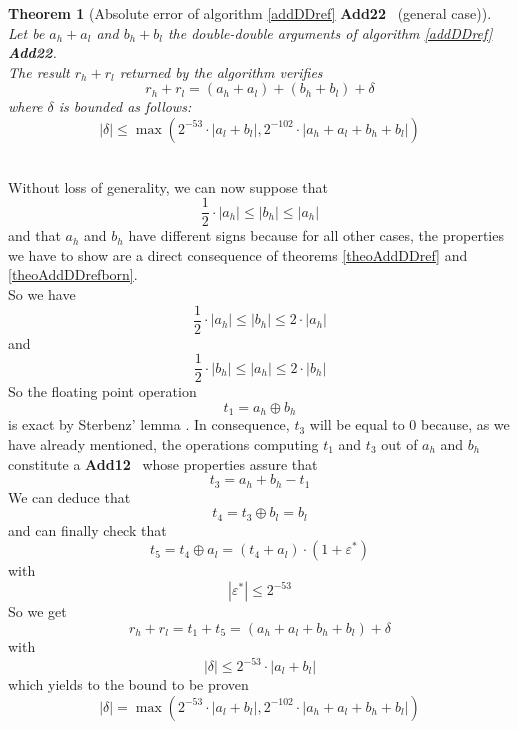 \documentclass[a4paper,10pt,twoside]{article}
\newtheorem{theorem}{Theorem}[section]
\newenvironment{proof}[1][Proof]{\begin{trivlist}
\item[\hskip \labelsep {\bfseries #1}]}{\end{trivlist}}
\newcommand{\qed}{\nobreak \ifvmode \relax \else \ifdim \lastskip<1.5em \hskip-\lastskip
\hskip1.5em plus0em minus0.5em \fi \nobreak \vrule height0.75em width0.5em depth0.25em\fi}
\newcommand{\hi}{\ensuremath{\mathit{h}}}
\newcommand{\lo}{\ensuremath{\mathit{l}}}
\newcommand{\Add}{{\bf Add12}}
\newcommand{\AddDD}{{\bf Add22}}
\renewcommand{\epsilon}{\varepsilon}
\begin{document}
\begin{theorem}[Absolute error of algorithm \ref{addDDref} \AddDD~
    (general case)\label{addDDerrabs}] ~ \\
Let be $a_\hi + a_\lo$ and $b_\hi + b_\lo$ the double-double arguments of algorithm \ref{addDDref} \AddDD.\\
The result $r_\hi + r_\lo$ returned by the algorithm verifies
$$r_\hi + r_\lo = \left(a_\hi + a_\lo \right) + \left( b_\hi + b_\lo \right) + \delta$$
where $\delta$ is bounded as follows:
$$\left \vert \delta \right \vert \leq \max\left( 2^{-53} \cdot \left \vert a_\lo + b_\lo \right \vert, 
                                                  2^{-102} \cdot \left \vert a_\hi + a_\lo + b_\hi + b_\lo \right \vert \right)$$
\end{theorem}
\begin{proof} ~ \\
Without loss of generality, we can now suppose that 
$$\frac{1}{2} \cdot \left \vert a_\hi \right \vert \leq \left \vert b_\hi \right \vert \leq \left \vert a_\hi \right \vert$$
and that $a_\hi$ and $b_\hi$ have different signs
because for all other cases, the properties we have to show are a direct
consequence of theorems \ref{theoAddDDref} and \ref{theoAddDDrefborn}.\\
So we have 
$$\frac{1}{2} \cdot \left \vert a_\hi \right \vert \leq \left \vert b_\hi \right \vert \leq 2 \cdot \left \vert a_\hi \right \vert$$
and
$$\frac{1}{2} \cdot \left \vert b_\hi \right \vert \leq \left \vert a_\hi \right \vert \leq 2 \cdot \left \vert b_\hi \right \vert$$
So the floating point operation
$$t_1 = a_\hi \oplus b_\hi$$
is exact by Sterbenz' lemma \cite{Ste74}.
In consequence, $t_3$ will be equal to $0$ because, as we have already
mentioned, the operations computing $t_1$ and $t_3$ out of $a_\hi$ and $b_\hi$ 
constitute a \Add~ whose properties assure that
$$t_3 = a_\hi + b_\hi - t_1$$
We can deduce that
$$t_4 = t_3 \oplus b_\lo = b_\lo$$
and can finally check that
$$t_5 = t_4 \oplus a_\lo = \left( t_4 + a_\lo \right) \cdot \left( 1 + \epsilon^* \right)$$
with
$$\left \vert \epsilon^* \right \vert \leq 2^{-53}$$
So we get
$$r_\hi + r_\lo = t_1 + t_5 = \left( a_\hi + a_\lo + b_\hi + b_\lo \right) + \delta$$
with
$$\left \vert \delta \right \vert \leq 2^{-53} \cdot \left \vert a_\lo + b_\lo \right \vert$$
which yields to the bound to be proven
$$\left \vert \delta \right \vert = \max\left( 2^{-53} \cdot \left \vert a_\lo + b_\lo \right \vert, 
                                               2^{-102} \cdot \left \vert a_\hi + a_\lo + b_\hi + b_\lo \right \vert \right)$$ \qed
\end{proof}
\end{document}

